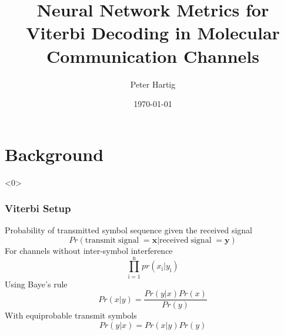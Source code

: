 \documentclass[10pt,tgadventor, onlymath]{beamer}
\title{\large \bfseries Neural Network Metrics for Viterbi Decoding in Molecular Communication Channels}
\author{Peter Hartig\\[3ex]
}
\date{\today}
\begin{document}
\frame{
\thispagestyle{empty}
\titlepage
}

\section{Background}

\begin{frame}<0>
\frametitle{Viterbi Setup}
	Probability of transmitted symbol sequence given the received signal
	\begin{equation}
		Pr(\mathbf{\mathrm{transmit \;signal}\;= x}|\mathbf{\mathrm{received \;signal}\; = y})
	\end{equation}
	For channels without inter-symbol interference
	\begin{equation}
		\prod_{\mathrm{i=1}}^{\mathrm{n}}pr(x_{\mathrm{i}}|y_{\mathrm{i}}) 
	\end{equation}
	Using Baye's rule
	\begin{equation}
		Pr(x|y) = \frac{Pr(y|x) Pr(x)}{Pr(y)}
	\end{equation}
	With equiprobable transmit symbols
	\begin{equation}
		Pr(y|x) = Pr(x|y) Pr(y)
	\end{equation}

\end{frame}
\end{document}
